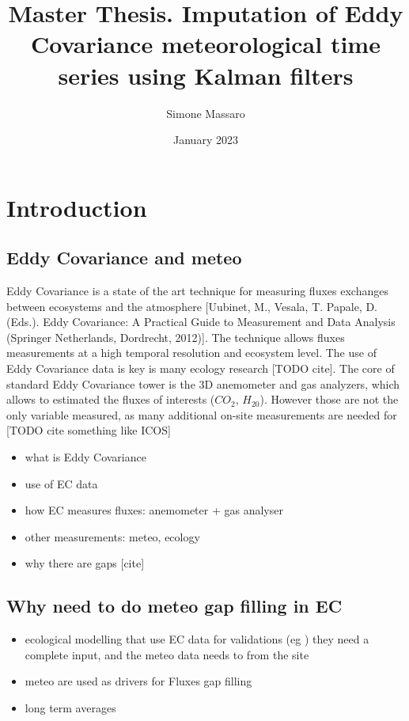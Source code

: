 \documentclass{article}
\title{Master Thesis. Imputation of Eddy Covariance meteorological time series using Kalman filters}
\author{Simone Massaro}
\date{January 2023}
\let\Oldsection\section
\renewcommand{\section}{\FloatBarrier\Oldsection}
\let\Oldsubsection\subsection
\renewcommand{\subsection}{\FloatBarrier\Oldsubsection}
\begin{document}
\maketitle
\tableofcontents
\clearpage

\section{Introduction}

\subsection{Eddy Covariance and meteo}

Eddy Covariance is a state of the art technique for measuring fluxes exchanges between ecosystems and the atmosphere [Uubinet, M., Vesala, T.  Papale, D. (Eds.). Eddy Covariance: A Practical Guide to Measurement and Data Analysis (Springer Netherlands, Dordrecht, 2012)].  The technique allows fluxes measurements at a high temporal resolution and ecosystem level. The use of Eddy Covariance data is key is many ecology research [TODO cite].
The core of standard Eddy Covariance tower is the 3D anemometer and gas analyzers, which allows to estimated the fluxes of interests ($CO_2$, $H_20$). However those are not the only variable measured, as many additional on-site measurements are needed for   [TODO cite something like ICOS]

\begin{itemize}
    \item what is Eddy Covariance
    \item use of EC data
    \item how EC measures fluxes: anemometer + gas analyser
    \item other measurements: meteo, ecology
\end{itemize}

\begin{itemize}
\item why there are gaps [cite]
\end{itemize}


\subsection{Why need to do meteo gap filling in EC}

\begin{itemize}
    \item ecological modelling that use EC data for validations (eg \cite{kramer_evaluation_2002}) they need a complete input, and the meteo data needs to from the site
    \item meteo are used as drivers for Fluxes gap filling 
    \item long term averages
\end{itemize}
\end{document}
